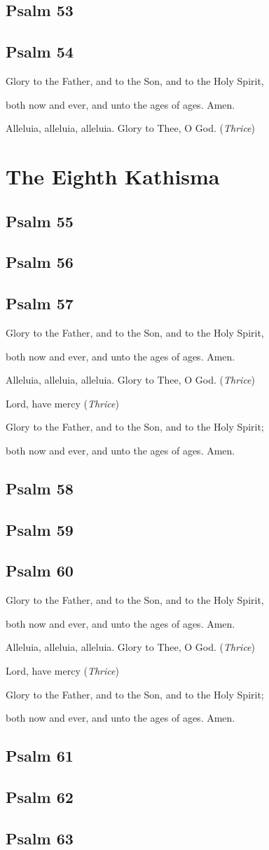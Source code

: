 \documentclass[12pt,openany]{book}
\newcommand{\kathismabreak}{
  \medskip
  \begin{center}
  \begin{footnotesize}
  Glory to the Father, and to the Son, and to the Holy Spirit,
  
  both now and ever, and unto the ages of ages. Amen.

  Alleluia, alleluia, alleluia. Glory to Thee, O God. (\textit{Thrice})

  Lord, have mercy (\textit{Thrice})

  Glory to the Father, and to the Son, and to the Holy Spirit;
  
  both now and ever, and unto the ages of ages. Amen.
  \end{footnotesize}
  \end{center}
  \smallbreak
}
\newcommand{\kathismaend}{
  \medskip
  \begin{center}
  \begin{footnotesize}
  Glory to the Father, and to the Son, and to the Holy Spirit,
  
  both now and ever, and unto the ages of ages. Amen.

  Alleluia, alleluia, alleluia. Glory to Thee, O God. (\textit{Thrice})
  \end{footnotesize}
  \end{center}
  \smallbreak
}
\begin{document}
\section{Psalm 53}

\section{Psalm 54}


\kathismaend

\chapter*{The Eighth Kathisma}
\smallskip
\section{Psalm 55}

\smallskip
\section{Psalm 56}

\smallskip
\section{Psalm 57}


\kathismabreak
\smallskip
\section{Psalm 58}

\smallskip
\section{Psalm 59}

\smallskip
\section{Psalm 60}


\kathismabreak
\smallskip
\pagebreak %
\section{Psalm 61}

\smallskip
\section{Psalm 62}

\smallskip
\section{Psalm 63}

\end{document}
